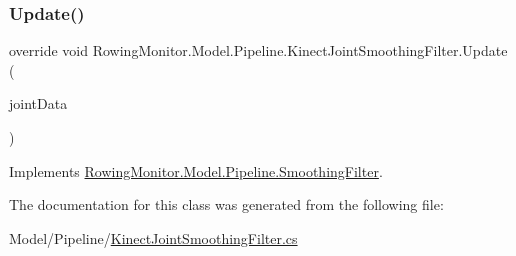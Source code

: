 \mbox{\label{class_rowing_monitor_1_1_model_1_1_pipeline_1_1_kinect_joint_smoothing_filter_a93cb6db0e00796dd2791789e472457b5}} 
\subsubsection{\texorpdfstring{Update()}{Update()}}
{\footnotesize\ttfamily override void Rowing\+Monitor.\+Model.\+Pipeline.\+Kinect\+Joint\+Smoothing\+Filter.\+Update (\begin{DoxyParamCaption}\item[{\hyperlink{struct_rowing_monitor_1_1_model_1_1_util_1_1_joint_data}{Joint\+Data}}]{joint\+Data }\end{DoxyParamCaption})\hspace{0.3cm}{\ttfamily [virtual]}}



Implements \hyperlink{class_rowing_monitor_1_1_model_1_1_pipeline_1_1_smoothing_filter_a6f017782fee0747d4ece9ec3ffea6115}{Rowing\+Monitor.\+Model.\+Pipeline.\+Smoothing\+Filter}.



The documentation for this class was generated from the following file\+:\begin{DoxyCompactItemize}
\item 
Model/\+Pipeline/\hyperlink{_kinect_joint_smoothing_filter_8cs}{Kinect\+Joint\+Smoothing\+Filter.\+cs}\end{DoxyCompactItemize}
